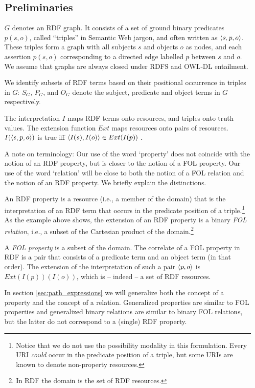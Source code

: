 \subsection{Preliminaries}
\label{sec:preliminaries}


$G$ denotes an RDF graph. It consists of a set of ground binary
predicates $p(s,o)$, called ``triples'' in Semantic Web jargon, and often
written as $\langle s,p,o\rangle$. These triples form a graph with all
subjects $s$ and objects $o$ as nodes, and 
each assertion $p(s,o)$ corresponding to a directed edge labelled $p$
between $s$ and $o$. 
We assume that graphs are always closed under
  RDFS and OWL-DL entailment.

We identify subsets of RDF terms based on
  their positional occurrence in triples in $G$:
  $S_G$, $P_G$, and $O_G$ denote the subject, predicate and object terms
  in $G$ respectively.

The interpretation $I$ maps RDF terms onto resources,
  and triples onto truth values.
The extension function $Ext$ maps resources onto pairs of resources.
$I(\langle s,p,o\rangle)$ is true iff
  $\langle I(s),I(o)\rangle \in Ext(I(p))$ \cite{Hayes2004}.

A note on terminology: Our use of the word `property' does not coincide
  with the notion of an RDF property, but is closer to the notion
  of a FOL property. Our use of the word `relation' will be close to
  both the notion of a FOL relation and the notion of an RDF property.
  We briefly explain the distinctions.

An RDF property is a resource (i.e., a member of the domain)
  that is the interpretation of
  an RDF term that occurs in the predicate position of a triple.\footnote{
    Notice that we do not use the possibility modality in this formulation.
    Every URI \emph{could} occur in the predicate position of a triple,
      but some URIs are known to denote non-property resources.
  }
As the example above shows, the extension of an RDF property is
  a binary \emph{FOL relation},
  i.e., a subset of the Cartesian product of the domain.\footnote{
    In RDF the domain is the set of RDF resources.}

A \emph{FOL property} is a subset of the domain.
The correlate of a FOL property in RDF is a pair that consists of
  a predicate term and an object term (in that order).
The extension of the interpretation of such a pair $\langle p,o\rangle$
  is $Ext(I(p))(I(o))$, which is -- indeed -- a set of RDF resources.

In section \ref{sec:path_expressions} we will generalize
  both the concept of a property and the concept of a relation.
Generalized properties are similar to FOL properties
  and generalized binary relations are similar to binary FOL relations,
  but the latter do not correspond to a (single) RDF property.

\begin{comment}
$\equivset{x}$ is the equivalence class for $x$
  under equivalence relation $\approx$.
\end{comment}

